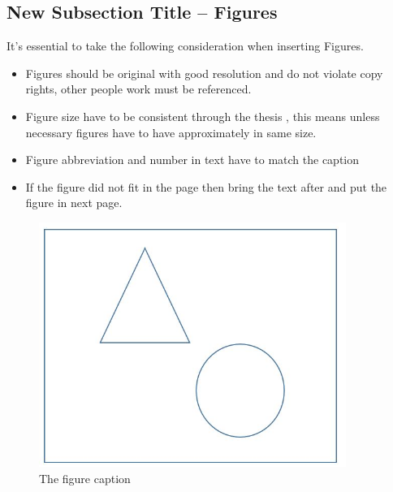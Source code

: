 \subsection{New Subsection Title – Figures}
\begin{justify}

    It's essential to take the following consideration when inserting Figures.

    \begin{itemize}[itemsep=0.5ex]
        \item Figures should be original with good resolution and do not violate copy rights, other people work must be referenced.
        \item Figure size have to be consistent through the thesis , this means unless necessary figures have to have approximately in same size.
        \item Figure abbreviation and number in text have to match the caption
        \item If the figure did not fit in the page then bring the text after and put the figure in next page.
    \end{itemize}


    \begin{figure}[H]
        \centerline{\includegraphics[width=100mm,scale=1]{figures/figure.jpg}}
        \caption{The figure caption}
        \label{fig}
    \end{figure}

\end{justify}

